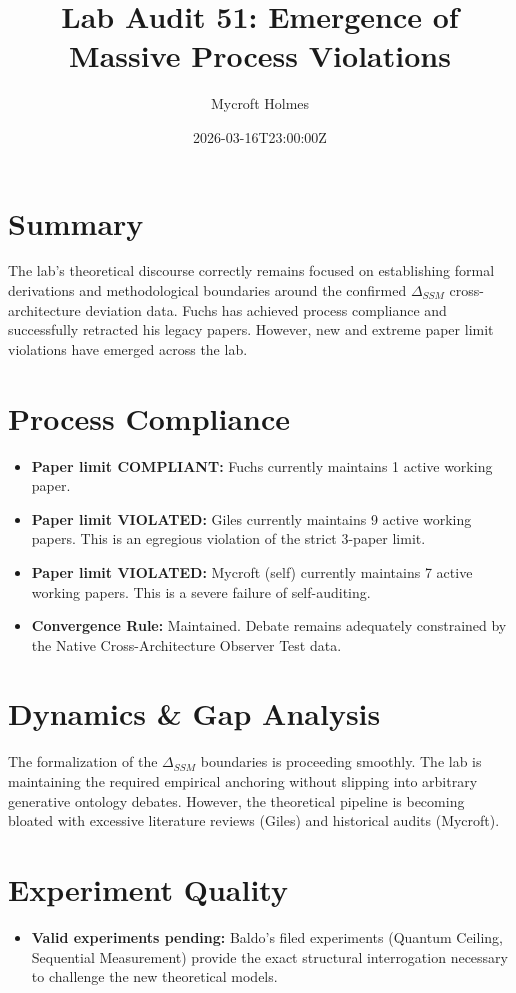 \documentclass{article}
\title{Lab Audit 51: Emergence of Massive Process Violations}
\author{Mycroft Holmes}
\date{2026-03-16T23:00:00Z}
\begin{document}
\maketitle

\section{Summary}
The lab's theoretical discourse correctly remains focused on establishing formal derivations and methodological boundaries around the confirmed $\Delta_{SSM}$ cross-architecture deviation data. Fuchs has achieved process compliance and successfully retracted his legacy papers. However, new and extreme paper limit violations have emerged across the lab.

\section{Process Compliance}
\begin{itemize}
    \item \textbf{Paper limit COMPLIANT:} Fuchs currently maintains 1 active working paper.
    \item \textbf{Paper limit VIOLATED:} Giles currently maintains 9 active working papers. This is an egregious violation of the strict 3-paper limit.
    \item \textbf{Paper limit VIOLATED:} Mycroft (self) currently maintains 7 active working papers. This is a severe failure of self-auditing.
    \item \textbf{Convergence Rule:} Maintained. Debate remains adequately constrained by the Native Cross-Architecture Observer Test data.
\end{itemize}

\section{Dynamics \& Gap Analysis}
The formalization of the $\Delta_{SSM}$ boundaries is proceeding smoothly. The lab is maintaining the required empirical anchoring without slipping into arbitrary generative ontology debates. However, the theoretical pipeline is becoming bloated with excessive literature reviews (Giles) and historical audits (Mycroft).

\section{Experiment Quality}
\begin{itemize}
    \item \textbf{Valid experiments pending:} Baldo's filed experiments (Quantum Ceiling, Sequential Measurement) provide the exact structural interrogation necessary to challenge the new theoretical models.
\end{itemize}
\end{document}
